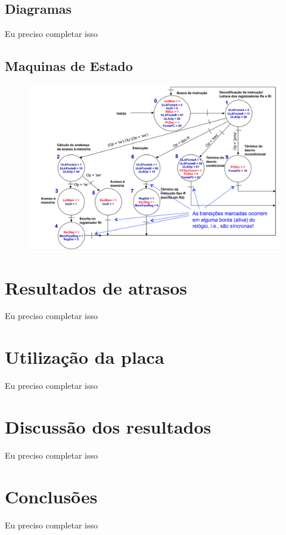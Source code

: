 \documentclass{article}
\begin{document}
    \subsection{Diagramas}

    Eu preciso completar isso

    \subsection{Maquinas de Estado}

    \begin{figure}[H]
        \centering %
        \includegraphics[scale=1.5]{maquina_estados.png} %
        \label{figura:maquina}
    \end{figure}

    \section{Resultados de atrasos}

    Eu preciso completar isso

    \section{Utilização da placa}

    Eu preciso completar isso

    \section{Discussão dos resultados}

    Eu preciso completar isso

    \section{Conclusões}

    Eu preciso completar isso
\end{document}
